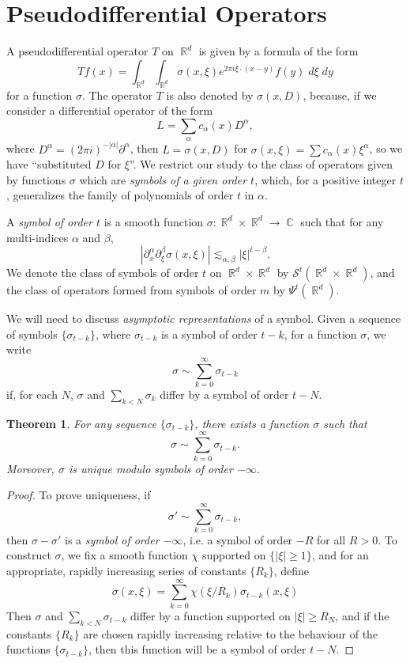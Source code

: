 \documentclass{article}
\DeclareMathOperator{\RR}{\mathbb{R}}
\DeclareMathOperator{\CC}{\mathbb{C}}
\theoremstyle{plain}
\newtheorem{theorem}{Theorem}
\theoremstyle{definition}
\begin{document}
\section{Pseudodifferential Operators}

A pseudodifferential operator $T$ on $\RR^d$ is given by a formula of the form
%
\[ Tf(x) = \int_{\RR^d} \int_{\RR^d} \sigma(x,\xi) e^{2 \pi i \xi \cdot (x - y)} f(y)\; d \xi\; dy \]
%
for a function $\sigma$. The operator $T$ is also denoted by $\sigma(x,D)$, because, if we consider a differential operator of the form
%
\[ L = \sum_\alpha c_\alpha(x) D^\alpha, \]
%
where $D^\alpha = (2 \pi i)^{-|\alpha|} \partial^\alpha$, then $L = \sigma(x,D)$ for $\sigma(x,\xi) = \sum c_\alpha(x) \xi^\alpha$, so we have ``substituted $D$ for $\xi$''. We restrict our study to the class of operators given by functions $\sigma$ which are \emph{symbols of a given order $t$}, which, for a positive integer $t$, generalizes the family of polynomials of order $t$ in $\alpha$.

A \emph{symbol of order $t$} is a smooth function $\sigma: \RR^d \times \RR^d \to \CC$ such that for any multi-indices $\alpha$ and $\beta$,
%
\[ |\partial_x^\alpha \partial_\xi^\beta \sigma(x,\xi)| \lesssim_{\alpha,\beta} |\xi|^{t - \beta}. \]
%
We denote the class of symbols of order $t$ on $\RR^d \times \RR^d$ by $\mathcal{S}^t(\RR^d \times \RR^d)$, and the class of operators formed from symbols of order $m$ by $\Psi^t(\RR^d)$.

We will need to discuss \emph{asymptotic representations} of a symbol. Given a sequence of symbols $\{ \sigma_{t-k} \}$, where $\sigma_{t-k}$ is a symbol of order $t - k$, for a function $\sigma$, we write
%
\[ \sigma \sim \sum_{k = 0}^\infty \sigma_{t-k} \]
%
if, for each $N$, $\sigma$ and $\sum_{k < N} \sigma_k$ differ by a symbol of order $t - N$.

\begin{theorem}
    For any sequence $\{ \sigma_{t-k} \}$, there exists a function $\sigma$ such that
    \[ \sigma \sim \sum_{k = 0}^\infty \sigma_{t-k}. \]
    Moreover, $\sigma$ is unique \emph{modulo symbols of order $-\infty$}.
\end{theorem}
\begin{proof}
    To prove uniqueness, if
    \[ \sigma' \sim \sum_{k = 0}^\infty \sigma_{t-k}, \]
    then $\sigma - \sigma'$ is a \emph{symbol of order $-\infty$}, i.e. a symbol of order $-R$ for all $R > 0$. To construct $\sigma$, we fix a smooth function $\chi$ supported on $\{ |\xi| \geq 1 \}$, and for an appropriate, rapidly increasing series of constants $\{ R_k \}$, define
    \[ \sigma(x,\xi) = \sum_{k = 0}^\infty \chi(\xi / R_k) \sigma_{t-k}(x,\xi) \]
    Then $\sigma$ and $\sum_{k < N} \sigma_{t - k}$ differ by a function supported on $|\xi| \geq R_N$, and if the constants $\{ R_k \}$ are chosen rapidly increasing relative to the behaviour of the functions $\{ \sigma_{t - k} \}$, then this function will be a symbol of order $t - N$.
\end{proof}
\end{document}
